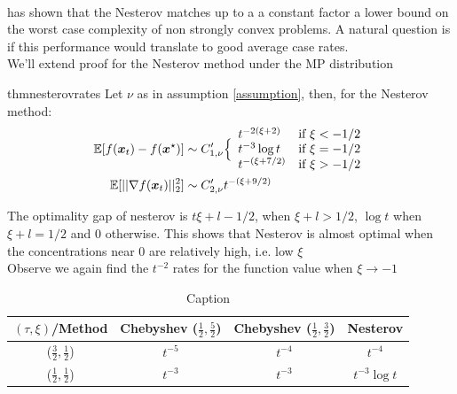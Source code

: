 \documentclass{article}
\begin{document}
\paragraph{}
\cite{nesterov2003introductory} has shown that the Nesterov matches up to a a constant factor a lower bound on the worst case complexity of non strongly convex problems. A natural question is if this performance would translate to good average case rates. \\
We'll extend \cite{paquette2020halting} proof for the Nesterov method under the MP distribution  
\begin{restatable}{thm}{nesterovrates}
Let $\nu$ as in assumption \ref{assumption}, then, for the Nesterov method:
\begin{align}
    \mathbb{E}[f({\boldsymbol x}_t)-f({\boldsymbol x}^\star)]&\sim C'_{1,\nu}
    \Big\{\begin{array}{ll}
		  t^{-2(\xi+2)}& \mbox{if } 
		  \xi<-1/2\\
		  t^{-3}\log t& \mbox{if } 
		  \xi=-1/2\\
		  t^{-(\xi+7/2)}& \mbox{if } 
		  \xi>-1/2
	\end{array}\\
	\mathbb{E}[||\nabla f({\boldsymbol x}_t)||^2_2] &\sim C'_{2,\nu}
		  t^{-(\xi+9/2)}
\end{align}
\end{restatable}
The optimality gap of nesterov is $t{\xi+l-1/2}$, when $\xi+l>1/2$, $\log t$ when $\xi+l=1/2$ and $0$ otherwise.
This shows that Nesterov is almost optimal when the concentrations near $0$ are relatively high, i.e. low $\xi$\\
Observe we again find the $t^{-2}$ rates for the function value when $\xi\rightarrow-1$

\begin{table}[H]
    \centering
    \begin{tabular}{c|c|c|c}
         $(\tau,\xi)$/Method& Chebyshev ($\frac{1}{2},\frac{5}{2}$) & Chebyshev ($\frac{1}{2},\frac{3}{2}$) &  Nesterov  \\
         \hline
         ($\frac{3}{2},\frac{1}{2}$)&$t^{-5}$ & $t^{-4}$ & $t^{-4}$\\
         \hline
         ($\frac{1}{2},\frac{1}{2}$)&$t^{-3}$ & $t^{-3}$ & $t^{-3}\log t$
         
    \end{tabular}
    \caption{Caption}
    \label{tab:theoretic rates}
\end{table}
\end{document}
